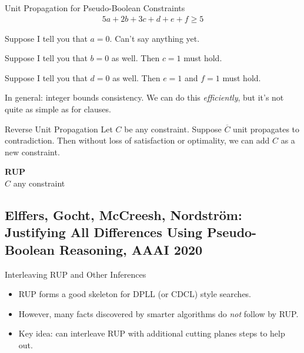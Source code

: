 \documentclass[aspectratio=169,compress,10pt]{beamer}
\begin{document}
\begin{frame}{Unit Propagation for Pseudo-Boolean Constraints}
    \begin{align*}
        5a + 2b + 3c + d + e + f \ge 5
    \end{align*}

    Suppose I tell you that $a = 0$. Can't say anything yet.

    \bigskip
    \pause

    Suppose I tell you that $b = 0$ as well. Then $c = 1$ must hold.

    \bigskip
    \pause

    Suppose I tell you that $d = 0$ as well. Then $e = 1$ and $f = 1$ must hold.

    \bigskip
    \pause

    In general: integer bounds consistency. We can do this \emph{efficiently}, but it's not quite as
    simple as for clauses.
\end{frame}

\begin{frame}{Reverse Unit Propagation}
    Let $C$ be any constraint. Suppose $\overline{C}$ unit propagates to contradiction. Then without
    loss of satisfaction or optimality, we can add $C$ as a new constraint.

    \bigskip

    \begin{minipage}[c]{0.35\framewidth}
        \textcolor{uofgcobalt}{\textbf{RUP}}\\
        $C$ any constraint
    \end{minipage}\hfill\begin{minipage}[c]{0.60\framewidth}\begin{prooftree}
    \end{prooftree}\end{minipage}
\end{frame}

\subsection{Elffers, Gocht, McCreesh, Nordstr\"om: Justifying All Differences Using Pseudo-Boolean Reasoning, AAAI 2020}

\begin{frame}{Interleaving RUP and Other Inferences}
    \begin{itemize}
        \item RUP forms a good skeleton for DPLL (or CDCL) style searches.
        \item However, many facts discovered by smarter algorithms do \emph{not} follow by RUP.
        \item Key idea: can interleave RUP with additional cutting planes steps to help out.
    \end{itemize}
\end{frame}
\end{document}
